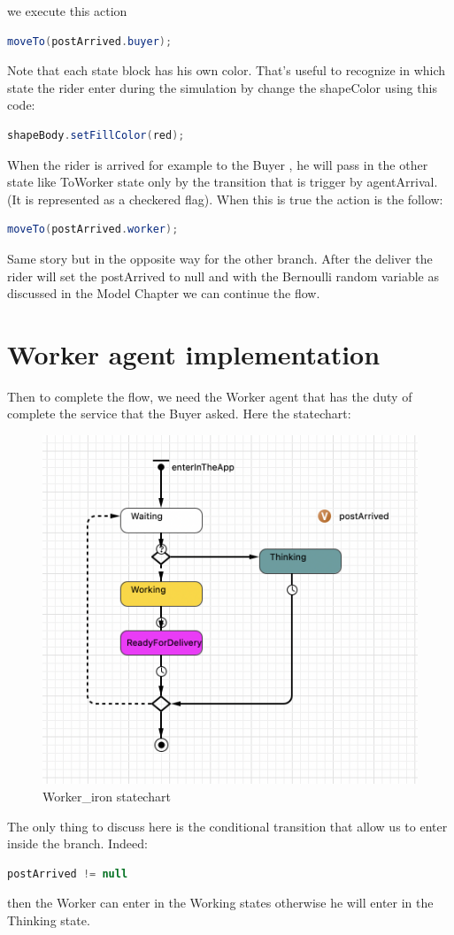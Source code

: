 we execute this action 
\begin{lstlisting}[language=Java]
moveTo(postArrived.buyer);
\end{lstlisting} 
Note that each state block has his own color. That's useful to recognize in which state the rider enter during the simulation by change the shapeColor using this code:
\begin{lstlisting}[language=Java]
shapeBody.setFillColor(red);
\end{lstlisting} 
When the rider is arrived for example to the Buyer , he will pass in the other state like ToWorker state only by the transition that is trigger by agentArrival. (It is represented as a checkered flag). When this is true the action is the follow:
\begin{lstlisting}[language=Java]
moveTo(postArrived.worker); 
\end{lstlisting} 
Same story but in the opposite way for the other branch. After the deliver the rider will set the postArrived to null and with the Bernoulli random variable as discussed in the Model Chapter we can continue the flow.
\section{Worker agent implementation}
Then to complete the flow, we need the Worker agent that has the duty of complete the service that the Buyer asked. Here the statechart:
\begin{figure}[hbtp]
\caption{Worker\_iron statechart}
\centering
\includegraphics[scale=0.6]{../Images/workerstatechart.png}
\end{figure}
The only thing to discuss here is the conditional transition that allow us to enter inside the branch. Indeed:
\begin{lstlisting}[language=Java]
postArrived != null
\end{lstlisting} 
then the Worker can enter in the Working states otherwise he will enter in the Thinking state.
